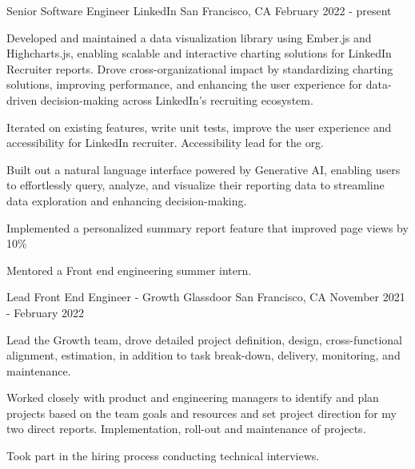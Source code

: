 

\begin{cventries}

  \cventry
    {Senior Software Engineer} %
    {LinkedIn} %
    {San Francisco, CA} %
    {February 2022 - present} %
    {
      \begin{cvitems} %
        \item {Developed and maintained a data visualization library using Ember.js and Highcharts.js, enabling scalable and interactive charting solutions for LinkedIn Recruiter reports. Drove cross-organizational impact by standardizing charting solutions, improving performance, and enhancing the user experience for data-driven decision-making across LinkedIn’s recruiting ecosystem.}
        \item {Iterated on existing features, write unit tests, improve the user experience and accessibility for LinkedIn recruiter. Accessibility lead for the org.} 
        \item {Built out a natural language interface powered by Generative AI, enabling users to effortlessly query, analyze, and visualize their reporting data to streamline data exploration and enhancing decision-making.}
        \item {Implemented a personalized summary report feature that improved page views by 10\%}
        \item {Mentored a Front end engineering summer intern.}
      \end{cvitems}
    }

  \cventry
    {Lead Front End Engineer - Growth} %
    {Glassdoor} %
    {San Francisco, CA} %
    {November 2021 - February 2022} %
    {
      \begin{cvitems} %
        \item {Lead the Growth team, drove detailed project definition, design, cross-functional alignment, estimation, in addition to task break-down, delivery, monitoring, and maintenance.}
        \item {Worked closely with product and engineering managers to identify and plan projects based on the team goals and resources and set project direction for my two direct reports. Implementation, roll-out and maintenance of projects.}
        \item {Took part in the hiring process conducting technical interviews.}
      \end{cvitems}
    }


\end{cventries}
